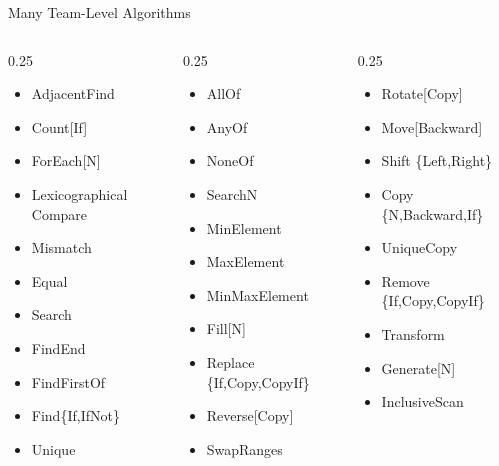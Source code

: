 \begin{frame}[fragile]{Many Team-Level Algorithms}

\begin{columns}
\begin{column}{0.25\textwidth}
\begin{itemize}
\item AdjacentFind
\item Count[If]
\item ForEach[N]
\item Lexicographical Compare
\item Mismatch
\item Equal
\item Search
\item FindEnd
\item FindFirstOf
\item Find\{If,IfNot\}
\item Unique
\end{itemize}
\end{column} 
\begin{column}{0.25\textwidth}
\begin{itemize}
\item AllOf
\item AnyOf
\item NoneOf
\item SearchN
\item MinElement
\item MaxElement
\item MinMaxElement
\item Fill[N]
\item Replace \{If,Copy,CopyIf\}
\item Reverse[Copy]
\item SwapRanges
\end{itemize}
\end{column} 
\begin{column}{0.25\textwidth}
\begin{itemize}
\item Rotate[Copy]
\item Move[Backward]
\item Shift \{Left,Right\}
\item Copy \{N,Backward,If\}
\item UniqueCopy
\item Remove \{If,Copy,CopyIf\}
\item Transform
\item Generate[N]
\item InclusiveScan

\end{itemize}
\end{column}
\end{columns}
\end{frame}
